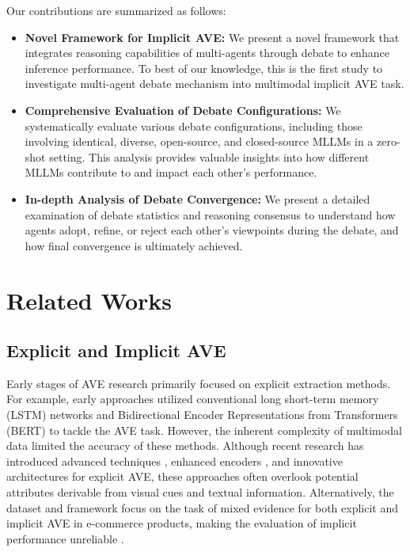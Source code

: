 \documentclass[11pt]{article}
\begin{document}
Our contributions are summarized as follows:

\begin{itemize}
    \item \textbf{Novel Framework for Implicit AVE:} We present a novel framework that integrates reasoning capabilities of multi-agents through debate to enhance inference performance. To best of our knowledge, this is the first study to investigate multi-agent debate mechanism into multimodal implicit AVE task. 
    \item \textbf{Comprehensive Evaluation of Debate Configurations:} We systematically evaluate various debate configurations, including those involving identical, diverse, open-source, and closed-source MLLMs in a zero-shot setting. This analysis provides valuable insights into how different MLLMs contribute to and impact each other's performance.
    \item \textbf{In-depth Analysis of Debate Convergence:} We present a detailed examination of debate statistics and reasoning consensus to understand how agents adopt, refine, or reject each other’s viewpoints during the debate, and how final convergence is ultimately achieved.
\end{itemize}

\section{Related Works}
\label{sec:related works}

\subsection{Explicit and Implicit AVE}
\label{sec:ImplicitAVE}

Early stages of AVE research primarily focused on explicit extraction methods. For example, early approaches \citep{Zheng:2018, Wang:2020} utilized conventional long short-term memory (LSTM) networks and Bidirectional Encoder Representations from Transformers (BERT) to tackle the AVE task. However, the inherent complexity of multimodal data limited the accuracy of these methods. Although recent research has introduced advanced techniques \citep{yang-etal-2023-mixpave, sabeh2024empiricalcomparisongenerativeapproaches}, enhanced encoders \citep{wang-etal-2022-smartave}, and innovative architectures \citep{brinkmann2024extractgptexploringpotentiallarge, loughnane-etal-2024-explicit} for explicit AVE, these approaches often overlook potential attributes derivable from visual cues and textual information. Alternatively, the dataset and framework focus on the task of mixed evidence for both explicit and implicit AVE in e-commerce products, making the evaluation of implicit performance unreliable \citep{wang2022smartave, liu2023multimodal, wang2023mpkgac}.
\end{document}
